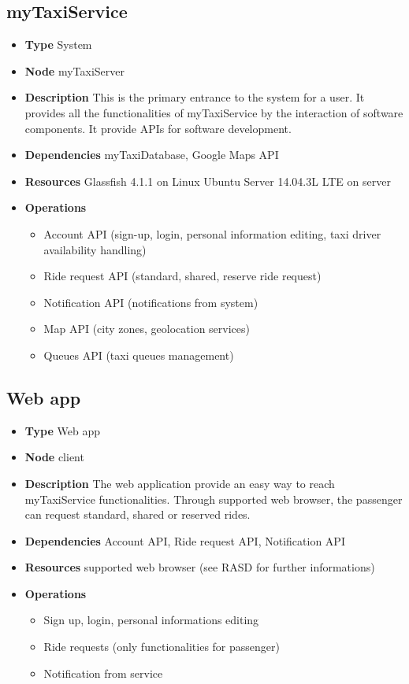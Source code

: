 \subsection{myTaxiService}
\begin{itemize}
	\item[]\textbf{Type} System
	\item[]\textbf{Node} myTaxiServer
	\item[]\textbf{Description} This is the primary entrance to the system for a user. It provides all the functionalities of myTaxiService by the interaction of software components. It provide APIs for software development.
	\item[]\textbf{Dependencies} myTaxiDatabase, Google Maps API
	\item[]\textbf{Resources} Glassfish 4.1.1 on Linux Ubuntu Server 14.04.3L LTE on server
	\item[]\textbf{Operations}\begin{itemize}
		\item Account API (sign-up, login, personal information editing, taxi driver availability handling)
		\item Ride request API (standard, shared, reserve ride request)
		\item Notification API (notifications from system)
		\item Map API (city zones, geolocation services)
		\item Queues API (taxi queues management)
	\end{itemize}
\end{itemize}

\subsection{Web app}
\begin{itemize}
	\item[]\textbf{Type} Web app
	\item[]\textbf{Node} client
	\item[]\textbf{Description} The web application provide an easy way to reach myTaxiService functionalities. Through supported web browser, the passenger can request standard, shared or reserved rides.
	\item[]\textbf{Dependencies} Account API, Ride request API, Notification API
	\item[]\textbf{Resources} supported web browser (see RASD for further informations)
	\item[]\textbf{Operations}\begin{itemize}
		\item Sign up, login, personal informations editing
		\item Ride requests (only functionalities for passenger)
		\item Notification from service
	\end{itemize}
\end{itemize}

